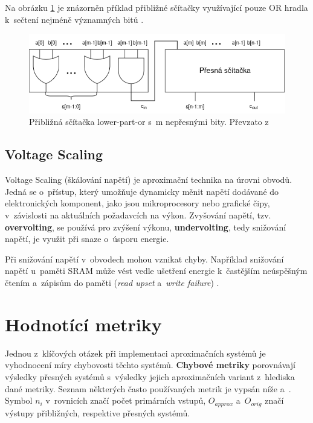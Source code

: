 Na obrázku \ref{fig:approx_adder} je znázorněn příklad přibližné sčítačky využívající pouze OR hradla k~sečtení nejméně významných bitů \cite{log_mults}.

\begin{figure}[H]
    \centering
    \includegraphics[width=\textwidth]{obrazky-figures/scitacka.png}
    \caption{Přibližná sčítačka lower-part-or s~m nepřesnými bity. Převzato z~\cite{log_mults}}
    \label{fig:approx_adder}
\end{figure}

\subsection*{Voltage Scaling}
Voltage Scaling (škálování napětí) je aproximační technika na úrovni obvodů. Jedná se o~přístup, který umožňuje dynamicky měnit napětí dodávané do elektronických komponent, jako jsou mikroprocesory nebo grafické čipy, v~závislosti na aktuálních požadavcích na výkon. Zvyšování napětí, tzv. \textbf{overvolting}, se používá pro zvýšení výkonu, \textbf{undervolting}, tedy snižování napětí, je využit při snaze o~úsporu energie.

Při snižování napětí v~obvodech mohou vznikat chyby. Například snižování napětí u~paměti SRAM může vést vedle ušetření energie k~častějším neúspěšným čtením a~zápisům do paměti (\textit{read upset} a~\textit{write failure}) \cite{ac_techniques}.

\section{Hodnotící metriky} \label{error_metrics}
Jednou z~klíčových otázek při implementaci aproximačních systémů je vyhodnocení míry chybovosti těchto systémů. \textbf{Chybové metriky} porovnávají výsledky přesných systémů s~výsledky jejich aproximačních variant z~hlediska dané metriky. Seznam některých často používaných metrik je vypsán níže \cite{circuit_library} a~\cite{error_metrics}. Symbol $n_i$ v~rovnicích značí počet primárních vstupů, $O_{approx}$ a~$O_{orig}$ značí výstupy přibližných, respektive přesných systémů.

